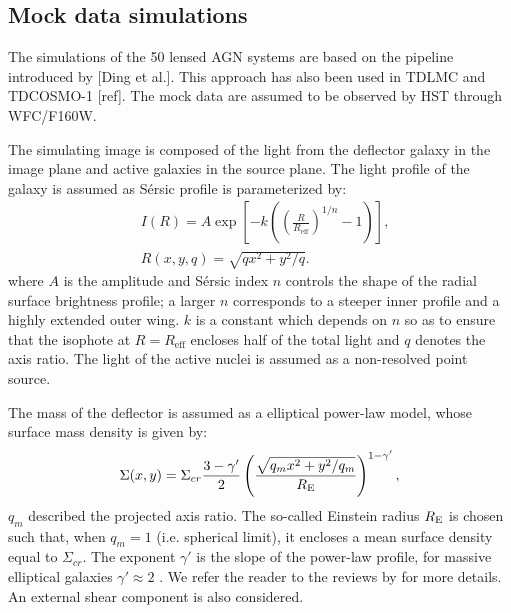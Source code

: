 \documentclass[useAMS,usenatbib,usegraphicx]{mn2e}
\begin{document}
\subsection{Mock data simulations}
The simulations of the 50 lensed AGN systems are based on the pipeline introduced by [Ding et al.].
This approach has also been used in TDLMC and TDCOSMO-1 [ref]. The mock data are assumed to be observed by HST through WFC/F160W. %

The simulating image is composed of the light from the deflector galaxy in the image plane and active galaxies in the source plane. The light profile of the galaxy is assumed as S\'ersic profile is parameterized by:
\begin{eqnarray}
   \label{eq:sersic}
   &I(R) = A \exp\left[-k\left(\left(\frac{R}{R_{\mathrm{eff}}}\right)^{1/n}-1\right)\right] ,\\
   &R(x,y,q) = \sqrt{qx^2+y^2/q}.
\end{eqnarray}
%
where $A$ is the amplitude and S\'ersic index $n$ controls the shape of the radial
surface brightness profile; a larger $n$ corresponds to a steeper
inner profile and a highly extended outer wing. 
 $k$ is a constant which
depends on $n$ so as to ensure that the isophote at $R=R_{\mathrm{eff}}$
encloses half of the total light \citep{C+B99} and
$q$ denotes the axis ratio. The light of the active nuclei is assumed as a non-resolved point source.

The mass of the deflector is assumed as a elliptical power-law model, whose surface mass density is given by:
%
\begin{equation}
 \label{massmodel}
 \Sigma(x,y)=\Sigma_{cr}\frac{3-\gamma^{\prime}}{2}\left(\frac{\sqrt{q_m x^{2}+y^{2}/q_m}}{R_{\rm E}}\right)^{1-\gamma^{\prime}},
\end{equation}
%
$q_m$ described the projected axis ratio.
The so-called Einstein radius $R_{\rm{E}}$ is chosen such
that, when $q_m=1$ (i.e. spherical limit), it encloses a mean surface
density equal to $\Sigma_{cr}.$
The exponent $\gamma'$ is the slope of the power-law profile,
for massive elliptical galaxies $\gamma' \approx2$  \citep{T+K02a,T+K04,Koo++09}.
We refer the reader to the reviews by \citet{Sch06, Bar10, Tre10} for more details.
An external shear component is also considered.
\end{document}
